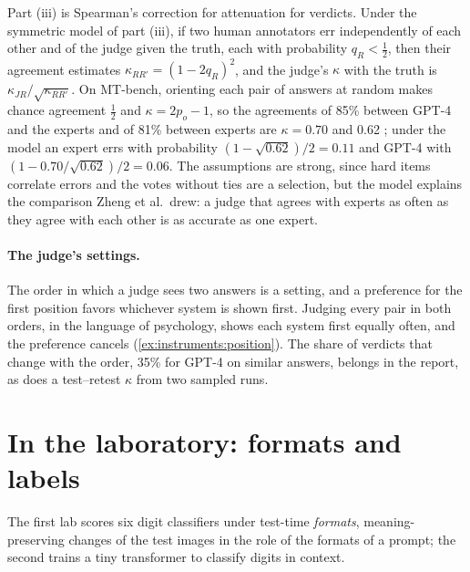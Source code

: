 \begin{refsection}
Part (iii) is Spearman's correction for attenuation \parencite{Spearman1904} for verdicts. Under the symmetric model of part (iii), if two human annotators err independently of each other and of the judge given the truth, each with probability $q_R<\frac12$, then their agreement estimates $\kappa_{RR'}=(1-2q_R)^2$, and the judge's $\kappa$ with the truth is $\kappa_{JR}/\sqrt{\kappa_{RR'}}$. On MT-bench, orienting each pair of answers at random makes chance agreement $\frac12$ and $\kappa=2p_o-1$, so the agreements of 85\% between GPT-4 and the experts and of 81\% between experts are $\kappa=0.70$ and 0.62 \parencite{ZhengEtAl2023}; under the model an expert errs with probability $(1-\sqrt{0.62})/2=0.11$ and GPT-4 with $(1-0.70/\sqrt{0.62})/2=0.06$. The assumptions are strong, since hard items correlate errors and the votes without ties are a selection, but the model explains the comparison Zheng et al.\ drew: a judge that agrees with experts as often as they agree with each other is as accurate as one expert.

\paragraph{The judge's settings.} The order in which a judge sees two answers is a setting, and a preference for the first position favors whichever system is shown first. Judging every pair in both orders,  in the language of psychology, shows each system first equally often, and the preference cancels (\cref{ex:instruments:position}). The share of verdicts that change with the order, 35\% for GPT-4 on similar answers, belongs in the report, as does a test--retest $\kappa$ from two sampled runs.

\section{In the laboratory: formats and labels}\label{sec:instruments:lab}

The first lab scores six digit classifiers under test-time \emph{formats}, meaning-preserving changes of the test images in the role of the formats of a prompt; the second trains a tiny transformer to classify digits in context.


\end{refsection}
